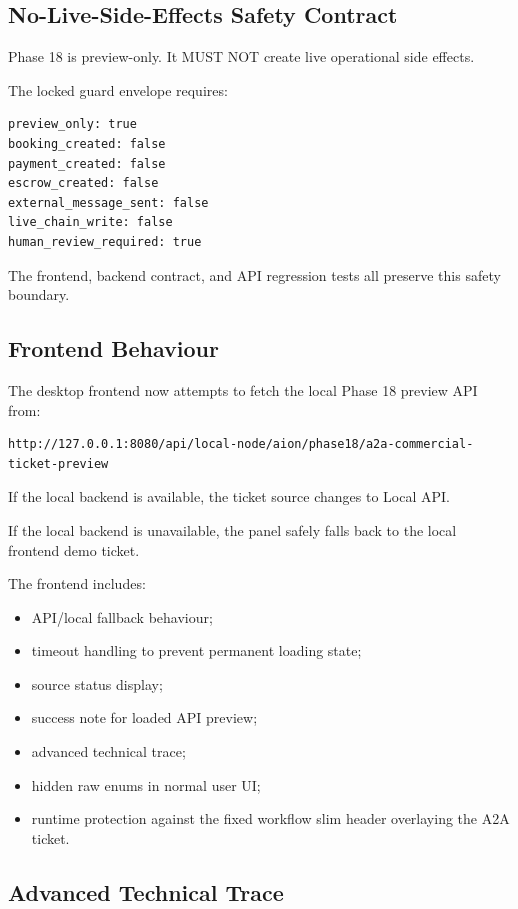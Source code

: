 \subsection{No-Live-Side-Effects Safety Contract}

Phase 18 is preview-only. It MUST NOT create live operational side effects.

The locked guard envelope requires:

\begin{verbatim}
preview_only: true
booking_created: false
payment_created: false
escrow_created: false
external_message_sent: false
live_chain_write: false
human_review_required: true
\end{verbatim}

The frontend, backend contract, and API regression tests all preserve this safety boundary.

\subsection{Frontend Behaviour}

The desktop frontend now attempts to fetch the local Phase 18 preview API from:

\begin{verbatim}
http://127.0.0.1:8080/api/local-node/aion/phase18/a2a-commercial-ticket-preview
\end{verbatim}

If the local backend is available, the ticket source changes to Local API.

If the local backend is unavailable, the panel safely falls back to the local frontend demo ticket.

The frontend includes:

\begin{itemize}
  \item API/local fallback behaviour;
  \item timeout handling to prevent permanent loading state;
  \item source status display;
  \item success note for loaded API preview;
  \item advanced technical trace;
  \item hidden raw enums in normal user UI;
  \item runtime protection against the fixed workflow slim header overlaying the A2A ticket.
\end{itemize}

\subsection{Advanced Technical Trace}

